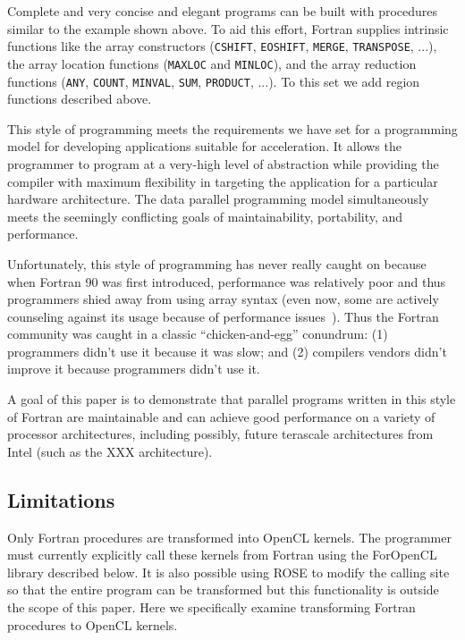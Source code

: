 \documentclass[10pt, conference, compsocconf]{IEEEtran}
\begin{document}
Complete and very concise and elegant programs can be built with procedures
similar to the example shown above. To aid this effort, Fortran
supplies intrinsic functions like the array constructors (\texttt{CSHIFT},
\texttt{EOSHIFT}, \texttt{MERGE}, \texttt{TRANSPOSE}, ...), the array location
functions (\texttt{MAXLOC} and \texttt{MINLOC}), and the array reduction
functions (\texttt{ANY}, \texttt{COUNT}, \texttt{MINVAL}, \texttt{SUM},
\texttt{PRODUCT}, ...).  To this set we add region functions described above.

This style of programming meets the requirements we have set for a programming
model for developing applications suitable for acceleration.  It allows the programmer to
program at a very-high level of abstraction while providing the compiler with
maximum flexibility in targeting the application for a particular hardware
architecture.  The data parallel programming model simultaneously meets the
seemingly conflicting goals of maintainability, portability, and performance.

Unfortunately, this style of programming has never really caught on because
when Fortran 90 was first introduced, performance was relatively poor and thus
programmers shied away from using array syntax (even now, some are actively
counseling against its usage because of performance issues~\cite{Cray-SC07}).
Thus the Fortran community was caught in a classic ``chicken-and-egg''
conundrum: (1) programmers didn't use it because it was slow; and (2)
compilers vendors didn't improve it because programmers didn't use it.

A goal of this paper is to demonstrate that parallel programs written in
this style of Fortran are maintainable and can achieve good performance on a
variety of processor architectures, including possibly, future terascale
architectures from Intel (such as the XXX architecture).

\subsection{Limitations}

Only Fortran procedures are transformed into OpenCL kernels.  The programmer
must currently explicitly call these kernels from Fortran using the ForOpenCL
library described below.  It is also possible using ROSE to modify the calling
site so that the entire program can be transformed but this functionality is
outside the scope of this paper.  Here we specifically examine transforming
Fortran procedures to OpenCL kernels.
\end{document}
